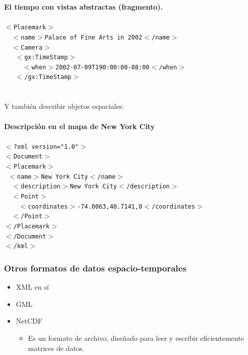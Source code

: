 \documentclass[a4paper,12pt,oneside]{report}
\begin{document}
\textbf{El tiempo con vistas abstractas (fragmento).}\\
\ \\
\texttt{$<$Placemark$>$\\
\ \ $<$name$>$Palace of Fine Arts in 2002$<$/name$>$\\
\ \ $<$Camera$>$\\
\ \ \ $<$gx:TimeStamp$>$\\
\ \ \ \ \ $<$when$>$2002-07-09T190:00:00-08:00$<$/when$>$ \\
\ \ \ $<$/gx:TimeStamp$>$\\}\\
\ \\
Y tambi\'en describir objetos espaciales:\\
\ \\
\textbf{Descripci\'on en el mapa de New York City}\\
\ \\
\texttt{$<$?xml version="1.0"$>$\\
$<$Document$>$\\
$<$Placemark$>$\\
\  $<$name$>$New York City$<$/name$>$\\
\ \ $<$description$>$New York City$<$/description$>$\\
\ \ $<$Point$>$\\
\ \ \ \ $<$coordinates$>$-74.0063,40.7141,0$<$/coordinates$>$\\
\ \ $<$/Point$>$\\
$<$/Placemark$>$\\
$<$/Document$>$\\
$<$/kml$>$}

\subsubsection*{Otros formatos de datos espacio-temporales}
\begin{itemize}
\item XML en s\'i
\item GML
\item NetCDF
\begin{itemize}
\item Es un formato de archivo, dise\~nado para leer y escribir eficientemente matrices de datos.
\end{itemize}
\end{itemize}



\end{document}
